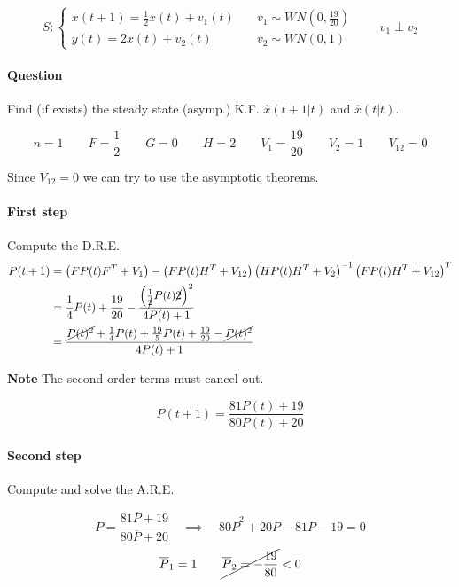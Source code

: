 \begin{exercise}
    \[
        S: \begin{cases}
            x(t+1) = \frac{1}{2}x(t) + v_1(t) \quad& v_1 \sim WN(0, \frac{19}{20}) \\
            y(t) = 2x(t) + v_2(t) \quad& v_2 \sim WN(0, 1)
        \end{cases}
        \qquad
        v_1 \perp v_2
    \]

    \paragraph{Question} Find (if exists) the steady state (asymp.) K.F. $\hat{x}(t+1|t)$ and $\hat{x}(t|t)$.

    \[
        n = 1 \qquad F = \frac{1}{2} \qquad G = 0 \qquad H = 2 \qquad V_1 = \frac{19}{20} \qquad V_2 = 1 \qquad V_{12} = 0
    \]

    Since $V_{12} = 0$ we can try to use the asymptotic theorems.

    \paragraph{First step} Compute the D.R.E.
    \begin{align*}
        P(t+1) &= \left( FP(t)F^T+V_1 \right) - \left( FP(t)H^T+V_{12} \right) \left( HP(t)H^T+V_2 \right)^{-1}\left( FP(t)H^T+V_{12} \right)^T \\
        &= \frac{1}{4}P(t) + \frac{19}{20} - \frac{ \left(\frac{1}{\cancel{2}}P(t)\cancel{2}\right)^2 }{4P(t)+1} \\
        &= \frac{\cancel{P(t)^2} + \frac{1}{4}P(t) + \frac{19}{5} P(t) + \frac{19}{20} - \cancel{P(t)^2} }{4P(t) + 1}
    \end{align*}

    \textbf{Note} The second order terms must cancel out.

    \[
        P(t+1) = \frac{81P(t) + 19}{80P(t)+20}
    \]

    \paragraph{Second step} Compute and solve the A.R.E.

    \[
        \overline{P} = \frac{81\overline{P} + 19}{80\overline{P}+20} \quad \implies \quad 80\overline{P}^2 + 20\overline{P}-81\overline{P}-19 = 0
    \]
    \[
        \overline{P}_1 = 1 \qquad \cancel{\overline{P}_2 = -\frac{19}{80}} < 0
    \]



\end{exercise}
